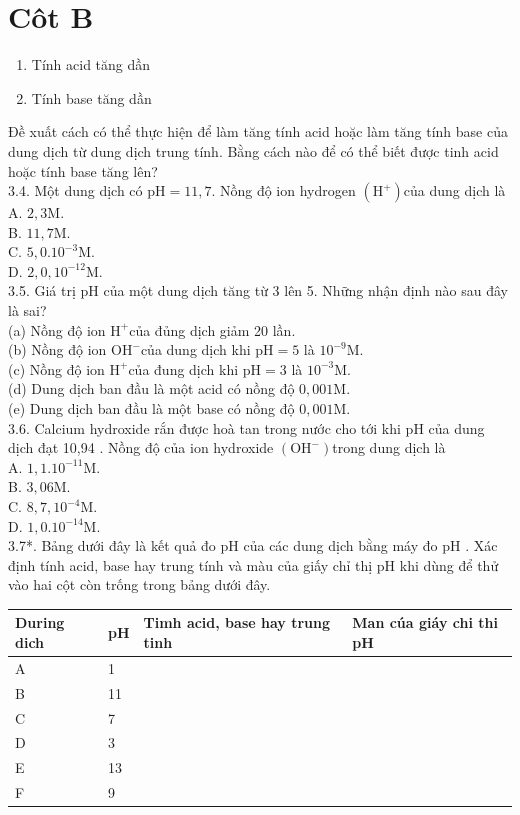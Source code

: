\documentclass[10pt]{article}
\begin{document}
\section*{Côt B}
\begin{enumerate}
  \item Tính acid tăng dần
  \item Tính base tăng dần
\end{enumerate}

Đề xuất cách có thể thực hiện để làm tăng tính acid hoặc làm tăng tính base của dung dịch từ dung dịch trung tính. Bằng cách nào để có thể biết được tinh acid hoặc tính base tăng lên?\\
3.4. Một dung dịch có $\mathrm{pH}=11,7$. Nồng độ ion hydrogen $\left(\mathrm{H}^{+}\right)$của dung dịch là\\
A. $2,3 \mathrm{M}$.\\
B. $11,7 \mathrm{M}$.\\
C. $5,0.10^{-3} \mathrm{M}$.\\
D. $2,0,10^{-12} \mathrm{M}$.\\
3.5. Giá trị pH của một dung dịch tăng từ 3 lên 5. Những nhận định nào sau đây là sai?\\
(a) Nồng độ ion $\mathrm{H}^{+}$của đủng dịch giảm 20 lần.\\
(b) Nồng độ ion $\mathrm{OH}^{-}$của dung dịch khi $\mathrm{pH}=5$ là $10^{-9} \mathrm{M}$.\\
(c) Nồng độ ion $\mathrm{H}^{+}$của đung dịch khi $\mathrm{pH}=3$ là $10^{-3} \mathrm{M}$.\\
(d) Dung dịch ban đầu là một acid có nồng độ $0,001 \mathrm{M}$.\\
(e) Dung dịch ban đầu là một base có nồng độ $0,001 \mathrm{M}$.\\
3.6. Calcium hydroxide rắn được hoà tan trong nước cho tới khi pH của dung dịch đạt 10,94 . Nồng độ của ion hydroxide $\left(\mathrm{OH}^{-}\right)$trong dung dịch là\\
A. $1,1.10^{-11} \mathrm{M}$.\\
B. $3,06 \mathrm{M}$.\\
C. $8,7,10^{-4} \mathrm{M}$.\\
D. $1,0.10^{-14} \mathrm{M}$.\\
3.7*. Bảng dưới đây là kết quả đo pH của các dung dịch bằng máy đo pH . Xác định tính acid, base hay trung tính và màu của giấy chỉ thị pH khi dùng để thử vào hai cột còn trống trong bảng dưới đây.

\begin{center}
\begin{tabular}{|l|l|l|l|}
\hline
During dich & pH & Timh acid, base hay trung tinh & Man cúa giáy chi thi pH \\
\hline
A & 1 &  &  \\
\hline
B & 11 &  &  \\
\hline
C & 7 &  &  \\
\hline
D & 3 &  &  \\
\hline
E & 13 &  &  \\
\hline
F & 9 &  &  \\
\hline
\end{tabular}
\end{center}
\end{document}
